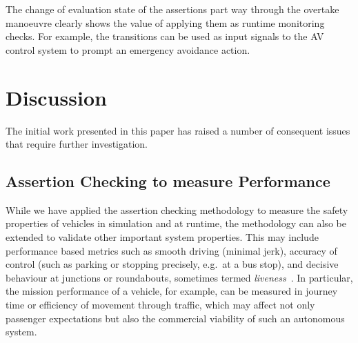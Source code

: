 The change of evaluation state of the assertions part way through the overtake manoeuvre clearly shows the value of applying them as runtime monitoring checks. For example, the transitions can be used as input signals to the AV control system to prompt an emergency avoidance action.




\section{Discussion} \label{discussion}
The initial work presented in this paper has raised a number of consequent issues that require further investigation.

\subsection{Assertion Checking to measure Performance}
While we have applied the assertion checking methodology to measure the safety properties of vehicles in simulation and at runtime, the methodology can also be extended to validate other important system properties. This may include performance based metrics such as smooth driving (minimal jerk), accuracy of control (such as parking or stopping precisely, e.g.\ at a bus stop), and decisive behaviour at junctions or roundabouts, sometimes termed \emph{liveness}~\cite{kim2014mpc}. In particular, the mission performance of a vehicle, for example, can be measured in journey time or efficiency of movement through traffic, which may affect not only passenger expectations but also the commercial viability of such an autonomous system. 

